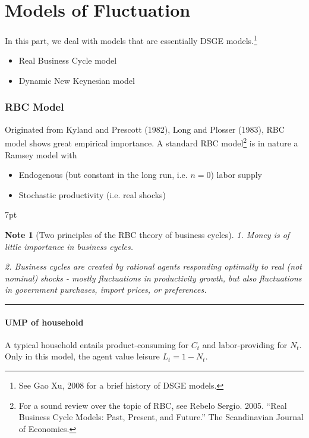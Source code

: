 \documentclass{article}
\providecommand{\tightlist}{
  \setlength{\itemsep}{0pt}
  \setlength{\parskip}{0pt}}
\newcommand*\sepline{%
  \begin{center}
    \rule[1ex]{.5\textwidth}{.5pt}
  \end{center}}
\newenvironment{blueblock}{
\def\FrameCommand{
  \hspace{1pt}
    {\color{DarkBlue}
    \vrule width 2pt}
    {\color{blueshade}
    \vrule width 4pt}
  \colorbox{blueshade}
}
\MakeFramed{
  \advance
  \hsize-
  \width
  \FrameRestore}
\noindent\hspace{-4.55pt}%
\begin{adjustwidth}{}{7pt}
\vspace{2pt}\vspace{2pt}
}
{\vspace{2pt}\end{adjustwidth}\endMakeFramed}
\newtheorem{note}{Note}
\begin{document}
\newpage
\part{Models of Fluctuation}
In this part, we deal with models that are essentially DSGE models.\footnote{See Gao Xu, 2008 for a brief history of DSGE models.}

\begin{itemize}
\tightlist
  \item Real Business Cycle model
  \item Dynamic New Keynesian model
\end{itemize}









\newpage
\section{RBC Model}

Originated from Kyland and Prescott (1982), Long and Plosser (1983), RBC model shows great empirical importance. A standard RBC model\footnote{For a sound review over the topic of RBC, see Rebelo Sergio. 2005. “Real Business Cycle Models: Past, Present, and Future.” The Scandinavian Journal of Economics. } is in nature a Ramsey model with
\begin{itemize}
\tightlist
  \item Endogenous (but constant in the long run, i.e. $n = 0$) labor supply
  \item Stochastic productivity (i.e. real shocks)
\end{itemize}


\begin{blueblock}
\begin{note}[Two principles of the RBC theory of business cycles]

1. Money is of little importance in business cycles.

2. Business cycles are created by rational agents responding optimally to
real (not nominal) shocks - mostly fluctuations in productivity growth,
but also fluctuations in government purchases, import prices, or preferences.
\end{note}
\end{blueblock}




\sepline
\subsection{UMP of household}
A typical household entails product-consuming for $C_t$ and labor-providing for $N_t$. Only in this model, the agent value leisure $L_t=1-N_t$.
\end{document}
